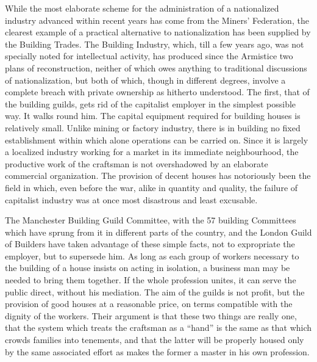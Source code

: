 \documentclass{book}
\begin{document}
While the most elaborate scheme for the administration of a nationalized industry advanced within recent years has come from the Miners’ Federation, the clearest example of a practical alternative to nationalization has been supplied by the Building Trades. The Building Industry, which, till a few years ago, was not specially noted for intellectual activity, has produced since the Armistice two plans of reconstruction, neither of which owes anything to traditional discussions of nationalization, but both of which, though in different degrees, involve a complete breach with private ownership as hitherto understood. The first, that of the building guilds, gets rid of the capitalist employer in the simplest possible way. It walks round him. The capital equipment required for building houses is relatively small. Unlike mining or factory industry, there is in building no fixed establishment within which alone operations can be carried on. Since it is largely a localized industry working for a market in its immediate neighbourhood, the productive work of the craftsman is not overshadowed by an elaborate commercial organization. The provision of decent houses has notoriously been the field in which, even before the war, alike in quantity and quality, the failure of capitalist industry was at once most disastrous and least excusable.

The Manchester Building Guild Committee, with the 57 building Committees which have sprung from it in different parts of the country, and the London Guild of Builders have taken advantage of these simple facts, not to expropriate the employer, but to supersede him. As long as each group of workers necessary to the building of a house insists on acting in isolation, a business man may be needed to bring them together. If the whole profession unites, it can serve the public direct, without his mediation. The aim of the guilds is not profit, but the provision of good houses at a reasonable price, on terms compatible with the dignity of the workers. Their argument is that these two things are really one, that the system which treats the craftsman as a “hand” is the same as that which crowds families into tenements, and that the latter will be properly housed only by the same associated effort as makes the former a master in his own profession.
\end{document}
